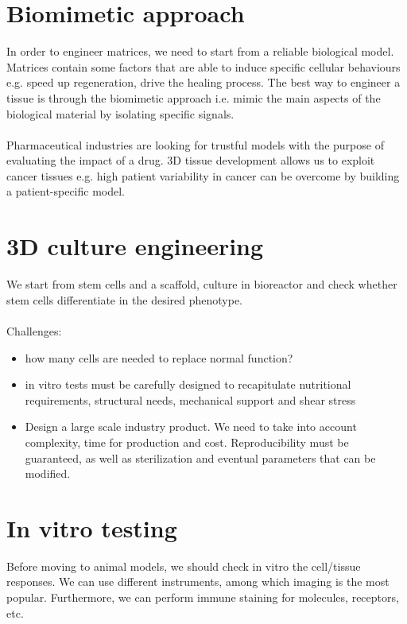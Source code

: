 \section{Biomimetic approach}
In order to engineer matrices, we need to start from a reliable biological model. 
Matrices contain some factors that are able to induce specific cellular behaviours e.g. speed up regeneration, drive the healing process. 
The best way to engineer a tissue is through the biomimetic approach i.e. mimic the main aspects of the biological material by isolating specific signals. 
\\
\\
\noindent
Pharmaceutical industries are looking for trustful models with the purpose of evaluating the impact of a drug. 
3D tissue development allows us to exploit cancer tissues e.g. high patient variability in cancer can be overcome by building a patient-specific model. 

\section{3D culture engineering}
We start from stem cells and a scaffold, culture in bioreactor and check whether stem cells differentiate in the desired phenotype.  
\\
\\
\noindent
Challenges:
\begin{itemize}
\item how many cells are needed to replace normal function?
\item in vitro tests must be carefully designed to recapitulate nutritional requirements, structural needs, mechanical support and shear stress
\item Design a large scale industry product. We need to take into account complexity, time for production and cost. Reproducibility must be guaranteed, as well as sterilization and eventual parameters that can be modified.
\end{itemize}

\section{In vitro testing}
Before moving to animal models, we should check in vitro the cell/tissue responses.
We can use different instruments, among which imaging is the most popular. 
Furthermore, we can perform immune staining for molecules, receptors, etc.

